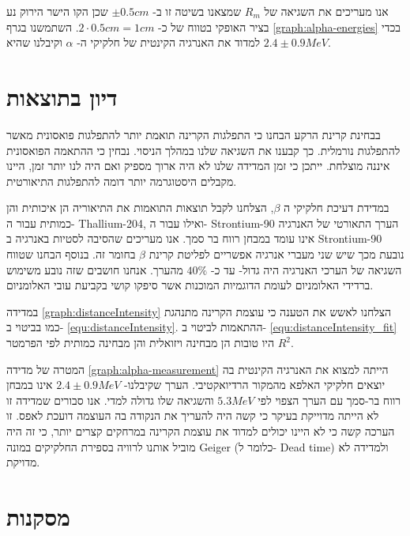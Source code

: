 \documentclass{article}
\begin{document}
אנו מעריכים את השגיאה של
$R_m$
שמצאנו בשיטה זו ב-
$\pm0.5cm$
שכן הקו הישר הירוק נע בציר האופקי בטווח של כ-
$2\cdot 0.5 cm = 1 cm$.
השתמשנו בגרף
\ref{graph:alpha-energies}
בכדי למדוד את האנרגיה הקינטית של חלקיקי ה-
$\alpha$
וקיבלנו שהיא
$2.4 \pm 0.9 MeV$.

\section{
דיון בתוצאות
}

בבחינת קרינת הרקע הבחנו כי התפלגות הקרינה תואמת יותר להתפלגות פואסונית מאשר להתפלגות נורמלית. כך קבענו את השגיאה שלנו במהלך הניסוי. נבחין כי ההתאמה הפואסונית איננה מוצלחת. ייתכן כי זמן המדידה שלנו לא היה ארוך מספיק ואם היה לנו יותר זמן, היינו מקבלים היסטוגרמה יותר דומה להתפלגות התיאורטית.

במדידת דעיכת חלקיקי ה
$\beta$,
הצלחנו לקבל תוצאות התואמות את התיאוריה הן איכותית והן כמותית עבור ה-
\textenglish{Thallium-204},
ואילו עבור ה-
\textenglish{Strontium-90}
הערך התאורטי של האנרגיה אינו עומד במבחן רווח בר סמך. אנו מעריכים שהסיבה לסטיות באנרגיה ב
\textenglish{Strontium-90}
נובעת מכך שיש שני מעברי אנרגיה אפשריים לפליטת קרינת $\beta$
בחומר זה.
בנוסף הבחנו שטווח השגיאה של הערכי האנרגיה היה גדול- עד כ-
$40\%$
מהערך.
אנחנו חושבים שזה נובע משימוש ברדידי האלומניום לעומת הדוגמיות המוכנות אשר סיפקו קושי בקביעת עובי האלומניום.

במדידה
\ref{graph:distanceIntensity}
הצלחנו לאשש את הטענה כי עוצמת הקרינה מתנהגת כמו בביטוי ב-
\ref{equ:distanceIntensity}.
ההתאמות לביטוי ב-
\ref{equ:distanceIntensity_fit}
היו טובות הן מבחינה ויזואלית והן מבחינה כמותית לפי הפרמטר
$R^2$.

המטרה של מדידה
\ref{graph:alpha-measurement}
הייתה למצוא את האנרגיה הקינטית בה יוצאים חלקיקי האלפא מהמקור הרדיואקטיבי. הערך שקיבלנו-
$2.4 \pm 0.9 MeV$
אינו במבחן רווח בר-סמך עם הערך הצפוי לפי
\cite{ENSDF}
$5.3 MeV$
והשגיאה שלו גדולה למדי.
אנו סבורים שמדידה זו לא הייתה מדוייקת בעיקר כי קשה היה להעריך את הנקודה בה העוצמה דועכת לאפס. זו הערכה קשה כי לא היינו יכולים למדוד את עוצמת הקרינה במרחקים קצרים יותר, כי זה היה מוביל אותנו לרוויה בספירת החלקיקים במונה
\textenglish{Geiger}
(כלומר ל-
\textenglish{Dead time})
ולמדידה לא מדויקת.

\section{
מסקנות
}
\end{document}
